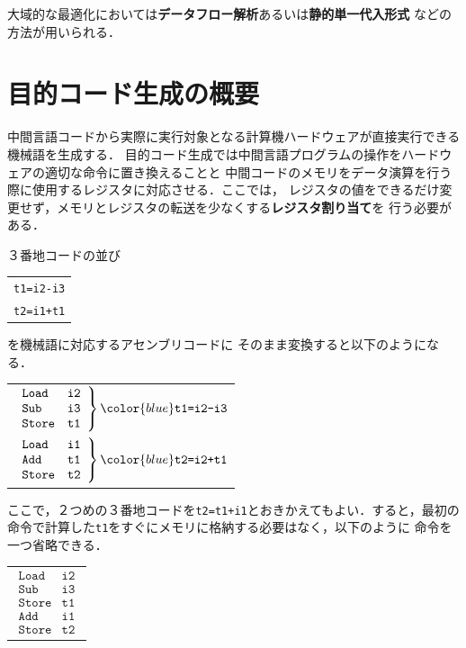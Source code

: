 \documentclass[a4j,dvipdfmx]{jbook}
\begin{document}
大域的な最適化においては{\bf データフロー解析}あるいは{\bf 静的単一代入形式}
などの方法が用いられる．

\section{目的コード生成の概要}

中間言語コードから実際に実行対象となる計算機ハードウェアが直接実行できる機械語を生成する．
目的コード生成では中間言語プログラムの操作をハードウェアの適切な命令に置き換えることと
中間コードのメモリをデータ演算を行う際に使用するレジスタに対応させる．ここでは，
レジスタの値をできるだけ変更せず，メモリとレジスタの転送を少なくする{\bf レジスタ割り当て}を
行う必要がある．

３番地コードの並び

\begin{center}
\begin{tabular}{l}
\verb|t1=i2-i3|\\
\verb|t2=i1+t1|
\end{tabular}
\end{center}

を機械語に対応するアセンブリコードに
そのまま変換すると以下のようになる．

\begin{center}
  \begin{tabular}{l}
    $\left .\begin{array}{ll}
      \texttt{Load}  & \texttt{i2}\\
      \texttt{Sub}   & \texttt{i3}\\
      \texttt{Store} & \texttt{t1}
    \end{array}\right\}
    {\color{blue}\texttt{t1=i2-i3}}$\\
    $\left .\begin{array}{ll}
      \texttt{Load} & \texttt{i1}\\
      \texttt{Add} & \texttt{t1}\\
      \texttt{Store} & \texttt{t2}
    \end{array}\right\}
    {\color{blue}\texttt{t2=i2+t1}}$\\
  \end{tabular}
\end{center}

ここで，２つめの３番地コードを\verb|t2=t1+i1|とおきかえてもよい．すると，最初の
命令で計算した\verb|t1|をすぐにメモリに格納する必要はなく，以下のように
命令を一つ省略できる．

\begin{center}
  \begin{tabular}{l}
    $\begin{array}{ll}
      \texttt{Load}  & \texttt{i2}\\
      \texttt{Sub}   & \texttt{i3}\\
      \texttt{Store} & \texttt{t1}\\
      \texttt{Add} & \texttt{i1}\\
      \texttt{Store} & \texttt{t2}
    \end{array}$\\
  \end{tabular}
\end{center}
\end{document}
